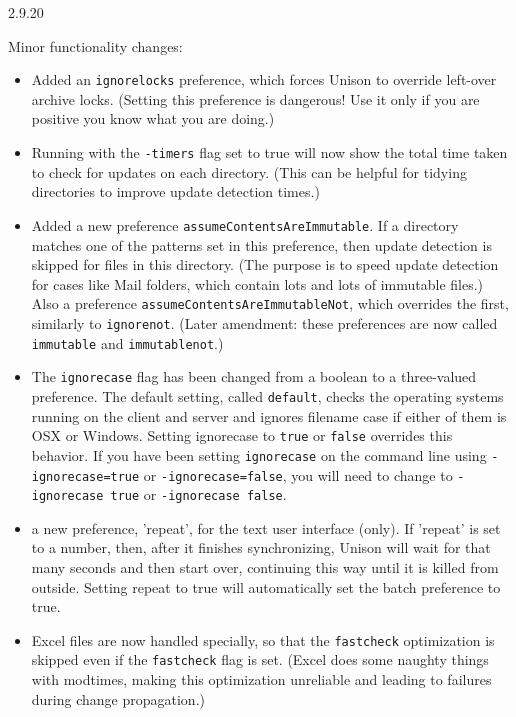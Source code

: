\begin{changesfromversion}{2.9.20}
\item Minor functionality changes:
\begin{itemize}

\item Added an {\tt ignorelocks} preference, which forces Unison to override left-over
  archive locks.  (Setting this preference is dangerous!  Use it only if you
  are positive you know what you are doing.) 
\item Running with the {\tt -timers} flag set to true will now show the total time taken
  to check for updates on each directory.  (This can be helpful for tidying directories to improve
  update detection times.)
\item Added a new preference {\tt assumeContentsAreImmutable}.  If a directory
  matches one of the patterns set in this preference, then update detection
  is skipped for files in this directory.  (The 
  purpose is to speed update detection for cases like Mail folders, which
  contain lots and lots of immutable files.)  Also a preference
  {\tt assumeContentsAreImmutableNot}, which overrides the first, similarly
  to {\tt ignorenot}.  (Later amendment: these preferences are now called
  {\tt immutable} and {\tt immutablenot}.)

\item The {\tt ignorecase} flag has been changed from a boolean to a three-valued
  preference.  The default setting, called {\tt default}, checks the operating systems
  running on the client and server and ignores filename case if either of them is
  OSX or Windows.  Setting ignorecase to {\tt true} or {\tt false} overrides
  this behavior.  If you have been setting {\tt ignorecase} on the command
  line using {\tt -ignorecase=true} or {\tt -ignorecase=false}, you will
  need to change to {\tt -ignorecase true} or {\tt -ignorecase false}.

\item a new preference, 'repeat', for the text user interface (only).  If 'repeat' is set to
  a number, then, after it finishes synchronizing, Unison will wait for that many seconds and
  then start over, continuing this way until it is killed from outside.  Setting repeat to true
  will automatically set the batch preference to true.  
  
\item Excel files are now handled specially, so that the {\tt fastcheck}
  optimization is skipped even if the {\tt fastcheck} flag is set.  (Excel
  does some naughty things with modtimes, making this optimization
  unreliable and leading to failures during change propagation.)


\end{itemize}
\end{changesfromversion}
